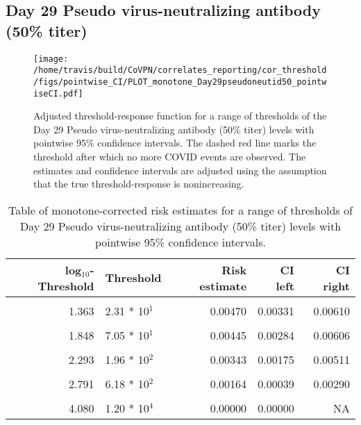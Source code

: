 \documentclass[]{book}
\theoremstyle{definition}
\theoremstyle{definition}
\theoremstyle{definition}
\newcommand{\1}{\mathbbm{1}}
\begin{document}
\clearpage

\clearpage

\clearpage

\hypertarget{day-29-pseudo-virus-neutralizing-antibody-50-titer-1}{%
\subsection{Day 29 Pseudo virus-neutralizing antibody (50\% titer)}\label{day-29-pseudo-virus-neutralizing-antibody-50-titer-1}}

\begin{figure}[H]
\centering
\texttt{[image: /home/travis/build/CoVPN/correlates\_reporting/cor\_threshold/figs/pointwise\_CI/PLOT\_monotone\_Day29pseudoneutid50\_pointwiseCI.pdf]}
\caption{Adjusted threshold-response function for a range of thresholds of the
  Day 29 Pseudo virus-neutralizing antibody (50\% titer) levels with pointwise 95\% confidence intervals. The dashed red line marks the threshold after which no more COVID events are observed. The estimates and confidence intervals are adjusted using the assumption that the true threshold-response is nonincreasing.}
\end{figure}
\begin{table}[!h]

\caption{\label{tab:unnamed-chunk-375}Table of monotone-corrected risk estimates for a range of thresholds of Day 29 Pseudo virus-neutralizing antibody (50\% titer) levels with pointwise 95\% confidence intervals.}
\centering
\begin{tabular}[t]{rlrrr}
\toprule
log$_{10}$-Threshold & Threshold & Risk estimate & CI left & CI right\\
\midrule
\cellcolor{gray!6}{0.699} & \cellcolor{gray!6}{5.00 * 10$^0$} & \cellcolor{gray!6}{0.00585} & \cellcolor{gray!6}{0.00442} & \cellcolor{gray!6}{0.00727}\\
1.363 & 2.31 * 10$^1$ & 0.00470 & 0.00331 & 0.00610\\
\cellcolor{gray!6}{1.628} & \cellcolor{gray!6}{4.25 * 10$^1$} & \cellcolor{gray!6}{0.00468} & \cellcolor{gray!6}{0.00318} & \cellcolor{gray!6}{0.00619}\\
1.848 & 7.05 * 10$^1$ & 0.00445 & 0.00284 & 0.00606\\
\cellcolor{gray!6}{2.078} & \cellcolor{gray!6}{1.20 * 10$^2$} & \cellcolor{gray!6}{0.00411} & \cellcolor{gray!6}{0.00249} & \cellcolor{gray!6}{0.00573}\\
2.293 & 1.96 * 10$^2$ & 0.00343 & 0.00175 & 0.00511\\
\cellcolor{gray!6}{2.537} & \cellcolor{gray!6}{3.44 * 10$^2$} & \cellcolor{gray!6}{0.00164} & \cellcolor{gray!6}{0.00037} & \cellcolor{gray!6}{0.00291}\\
2.791 & 6.18 * 10$^2$ & 0.00164 & 0.00039 & 0.00290\\
\cellcolor{gray!6}{3.109} & \cellcolor{gray!6}{1.29 * 10$^3$} & \cellcolor{gray!6}{0.00164} & \cellcolor{gray!6}{0.00000} & \cellcolor{gray!6}{0.00446}\\
4.080 & 1.20 * 10$^4$ & 0.00000 & 0.00000 & NA\\
\bottomrule
\end{tabular}
\end{table}
\end{document}
